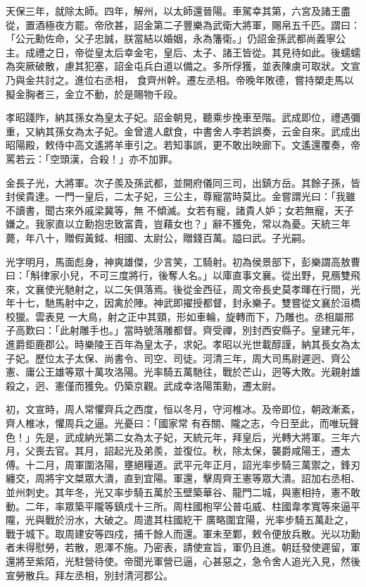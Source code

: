 \begin{pinyinscope}
 天保三年，就除太師。四年，解州，以太師還晉陽。車駕幸其第，六宮及諸王盡從，置酒極夜方罷。帝欣甚，詔金第二子豐樂為武衛大將軍，賜帛五千匹。謂曰：「公元勳佐命，父子忠誠，朕當結以婚姻，永為籓衛。」仍詔金孫武都尚義寧公主。成禮之日，帝從皇太后幸金宅，皇后、太子、諸王皆從。其見待如此。後蠕蠕為突厥破散，慮其犯塞，詔金屯兵白道以備之。多所俘獲，並表陳虜可取狀。文宣乃與金共討之。進位右丞相，
 食齊州幹。遷左丞相。帝晚年敗德，嘗持槊走馬以擬金胸者三，金立不動，於是賜物千段。



 孝昭踐阼，納其孫女為皇太子妃。詔金朝見，聽乘步挽車至階。武成即位，禮遇彌重，又納其孫女為太子妃。金曾遣人獻食，中書舍人李若誤奏，云金自來。武成出昭陽殿，敕侍中高文遙將羊車引之。若知事誤，更不敢出映廊下。文遙還覆奏，帝罵若云：「空頭漢，合殺！」亦不加罪。



 金長子光，大將軍。次子羨及孫武都，並開府儀同三司，出鎮方岳。其餘子孫，皆封侯貴達。一門一皇后，二太子妃，三公主，尊寵當時莫比。金嘗謂光曰：「我雖不讀書，聞古來外戚梁冀等，無
 不傾滅。女若有寵，諸貴人妒；女若無寵，天子嫌之。我家直以立勳抱忠致富貴，豈藉女也？」辭不獲免，常以為憂。天統三年薨，年八十，贈假黃鉞、相國、太尉公，贈錢百萬。謚曰武。子光嗣。



 光字明月，馬面彪身，神爽雄傑，少言笑，工騎射。初為侯景部下，彭樂謂高敖曹曰：「斛律家小兒，不可三度將行，後奪人名。」以庫直事文襄。從出野，見鴈雙飛來，文襄使光馳射之，以二矢俱落焉。後從金西征，周文帝長史莫孝暉在行間，光年十七，馳馬射中之，因禽於陣。神武即擢授都督，封永樂子。雙嘗從文襄於洹橋校獵。雲表見
 一大鳥，射之正中其頸，形如車輪，旋轉而下，乃雕也。丞相屬邢子高歎曰：「此射雕手也。」當時號落雕都督。齊受禪，別封西安縣子。皇建元年，進爵鉅鹿郡公。時樂陵王百年為皇太子，求妃。孝昭以光世載醇謹，納其長女為太子妃。歷位太子太保、尚書令、司空、司徒。河清三年，周大司馬尉遲迥、齊公憲、庸公王雄等眾十萬攻洛陽。光率騎五萬馳往，戰於芒山，迥等大敗。光親射雄殺之，迥、憲僅而獲免。仍築京觀。武成幸洛陽策勳，遷太尉。



 初，文宣時，周人常懼齊兵之西度，恒以冬月，守河椎冰。及帝即位，朝政漸紊，齊人椎冰，懼周兵之逼。光憂曰：「國家常
 有吞關、隴之志，今日至此，而唯玩聲色！」先是，武成納光第二女為太子妃，天統元年，拜皇后，光轉大將軍。三年六月，父喪去官。其月，詔起光及弟羨，並復位。秋，除太保，襲爵咸陽王，遷太傅。十二月，周軍圍洛陽，壅絕糧道。武平元年正月，詔光率步騎三萬禦之，鋒刃纏交，周將宇文桀眾大潰，直到宜陽。軍還，擊周齊王憲等眾大潰。詔加右丞相、並州刺史。其年冬，光又率步騎五萬於玉壁築華谷、龍門二城，與憲相持，憲不敢動。二年，率眾築平隴等鎮戍十三所。周柱國枹罕公普屯威、柱國韋孝寬等來逼平隴，光與戰於汾水，大破之。周遣其柱國紇干
 廣略圍宜陽，光率步騎五萬赴之，戰于城下。取周建安等四戍，捕千餘人而還。軍未至鄴，敕令便放兵散。光以功勳者未得慰勞，若散，恩澤不施。乃密表，請使宣旨，軍仍且進。朝廷發使遲留，軍還將至紫陌，光駐營待使。帝聞光軍營已逼，心甚惡之，急令舍人追光入見，然後宣勞散兵。拜左丞相，別封清河郡公。




\end{pinyinscope}
